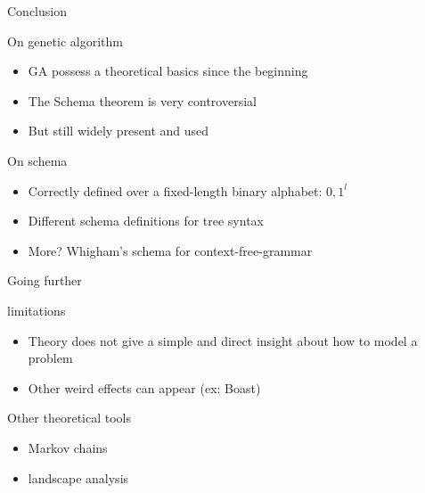 \begin{frame}{Conclusion}

  \begin{block}{On genetic algorithm}
    \begin{itemize}
    \item GA possess a theoretical basics since the beginning
    \item The Schema theorem is very controversial
    \item But still widely present and used
    \end{itemize}
  \end{block}

  \begin{block}{On schema}
    \begin{itemize}
      \item Correctly defined over a fixed-length binary alphabet: ${0,1}^l$
      \item Different schema definitions for tree syntax
      \item More? Whigham's schema for context-free-grammar\cite{whigham1995}
    \end{itemize}
  \end{block}
\end{frame}

\begin{frame}{Going further}
  \begin{block}{limitations}
    \begin{itemize}
      \item Theory does not give a simple and direct insight about how to model a problem
      \item Other weird effects can appear (ex: Boast)
    \end{itemize}
  \end{block}

  \begin{block}{Other theoretical tools}
    \begin{itemize}
      \item Markov chains
      \item landscape analysis
    \end{itemize}
  \end{block}
\end{frame}

